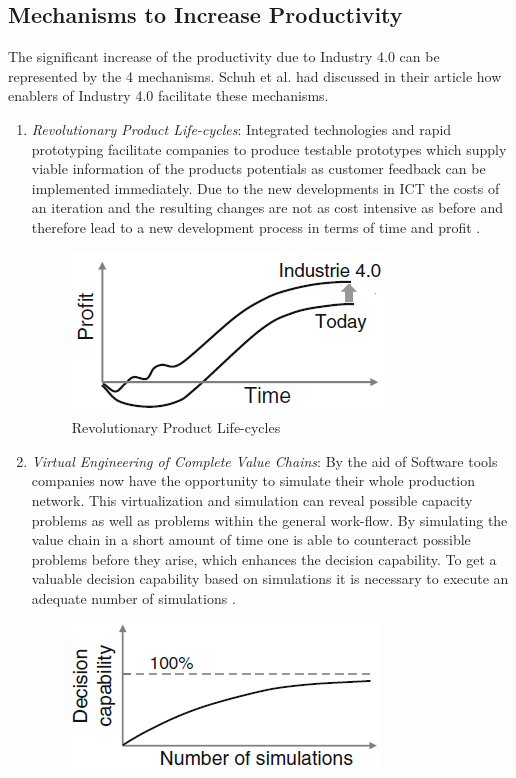 \subsection{Mechanisms to Increase Productivity}
The significant increase of the productivity due to Industry 4.0 can be represented by the 4 mechanisms. Schuh et al. \cite{IN4HYPO} had discussed in their article how enablers of Industry 4.0 facilitate these mechanisms.
\begin{enumerate}
\item \textit{Revolutionary Product Life-cycles}: Integrated technologies
and rapid prototyping facilitate companies to produce testable prototypes which
supply viable information of the products potentials as customer feedback can be
implemented immediately. Due to the new developments in \acs{ICT} the costs of an iteration and the resulting changes are not as cost intensive as before and therefore lead to a new development process in terms of time and profit  \cite{IN4HYPO}.
\begin{figure}[h!]
\includegraphics[scale=0.5]{./gfx/revlifecycle}
\centering
\caption{Revolutionary Product Life-cycles \cite{IN4HYPO}}
\label{fig:2.2}
\end{figure}
\item \textit{Virtual Engineering of Complete Value Chains}: By the aid of Software tools companies now have the opportunity to simulate their whole production network. This virtualization and simulation can reveal possible capacity problems as well as problems within the general work-flow. By simulating the value
chain in a short amount of time one is able to counteract possible problems before
they arise, which enhances the decision capability. To get a valuable decision capability based on simulations	it is necessary to execute an adequate number of simulations  \cite{IN4HYPO}.
\begin{figure}[h!]
\includegraphics[scale=0.5]{./gfx/revsimul}

\end{figure}
\end{enumerate}

